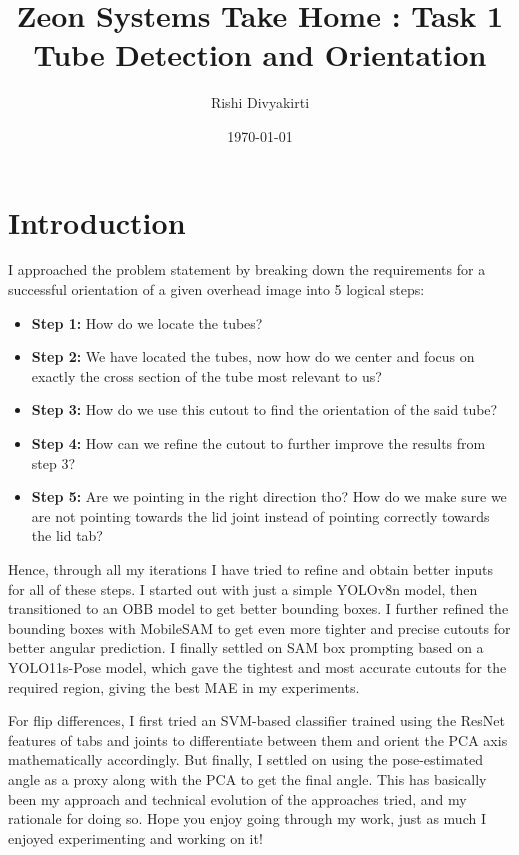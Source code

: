 \documentclass[11pt,a4paper]{article}
\title{\textbf{Zeon Systems Take Home : Task 1} \\ {Tube Detection and Orientation}}
\author{Rishi Divyakirti}
\date{\today}
\begin{document}
\maketitle

\newpage

\tableofcontents
\newpage
\section{Introduction}

I approached the problem statement by breaking down the requirements for a successful orientation of a given overhead image into 5 logical steps:
\begin{itemize}
    \item \textbf{Step 1:} How do we locate the tubes?
    \item \textbf{Step 2:} We have located the tubes, now how do we center and focus on exactly the cross section of the tube most relevant to us?
    \item \textbf{Step 3:} How do we use this cutout to find the orientation of the said tube?
    \item \textbf{Step 4:} How can we refine the cutout to further improve the results from step 3?
    \item \textbf{Step 5:} Are we pointing in the right direction tho? How do we make sure we are not pointing towards the lid joint instead of pointing correctly towards the lid tab?
\end{itemize}

Hence, through all my iterations I have tried to refine and obtain better inputs for all of these steps. I started out with just a simple YOLOv8n model, then transitioned to an OBB model to get better bounding boxes. I further refined the bounding boxes with MobileSAM to get even more tighter and precise cutouts for better angular prediction. I finally settled on SAM box prompting based on a YOLO11s-Pose model, which gave the tightest and most accurate cutouts for the required region, giving the best MAE in my experiments. 

For flip differences, I first tried an SVM-based classifier trained using the ResNet features of tabs and joints to differentiate between them and orient the PCA axis mathematically accordingly. But finally, I settled on using the pose-estimated angle as a proxy along with the PCA to get the final angle. This has basically been my approach and technical evolution of the approaches tried, and my rationale for doing so. Hope you enjoy going through my work, just as much I enjoyed experimenting and working on it!
\end{document}

